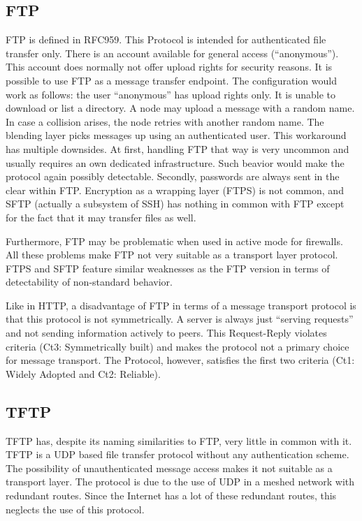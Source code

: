 \documentclass[a4paper,appendixprefix,pdfusetitle,twocolumn,fontsize=8pt,DIV=calc,8pt,draft]{\doctype} %
\begin{document}
\subsection{FTP}
FTP is defined in RFC959\cite{RFC959}. This Protocol is intended for authenticated file transfer only. There is an account available for general access (``anonymous''). This account does normally not offer upload rights for security reasons. It is possible to use FTP as a message transfer endpoint. The configuration would work as follows: the user ``anonymous'' has upload rights only. It is unable to download or list a directory. A node may upload a message with a random name. In case a collision arises, the node retries with another random name. The blending layer picks messages up using an authenticated user. This workaround has multiple downsides. At first, handling FTP that way is very uncommon and usually requires an own dedicated infrastructure. Such beavior would make the protocol again possibly detectable. Secondly, passwords are always sent in the clear within FTP. Encryption as a wrapping layer (FTPS) is not common, and SFTP (actually a subsystem of SSH) has nothing in common with FTP except for the fact that it may transfer files as well.

Furthermore, FTP may be problematic when used in active mode for firewalls. All these problems make FTP not very suitable as a transport layer protocol. FTPS and SFTP feature similar weaknesses as the FTP version in terms of detectability of non-standard behavior.

Like in HTTP, a disadvantage of FTP in terms of a message transport protocol is that this protocol is not symmetrically. A server is always just ``serving requests'' and not sending information actively to peers. This Request-Reply violates criteria (Ct3: Symmetrically built) and makes the protocol not a primary choice for message transport. The Protocol, however, satisfies the first two criteria  (Ct1: Widely Adopted and Ct2: Reliable).

\subsection{TFTP}
TFTP has, despite its naming similarities to FTP, very little in common with it. TFTP is a UDP based file transfer protocol without any authentication scheme. The possibility of unauthenticated message access makes it not suitable as a transport layer. The protocol is due to the use of UDP in a meshed network with redundant routes. Since the Internet has a lot of these redundant routes, this neglects the use of this protocol.
\end{document}
